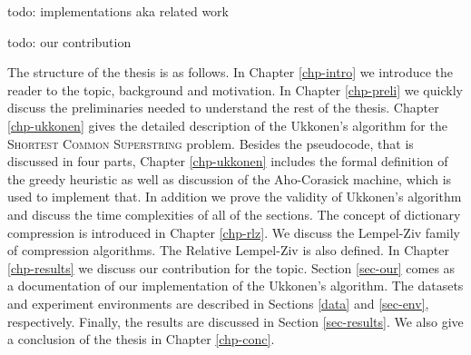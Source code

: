 \documentclass[english,twoside,censored,csm,algorithms-track-2020]{HYthesisML}
\theoremstyle{plain}
\theoremstyle{definition}
\begin{document}
todo: implementations aka related work

todo: our contribution

The structure of the thesis is as follows. In Chapter \ref{chp-intro} we introduce the reader to the
topic, background and motivation. In Chapter \ref{chp-preli} we quickly discuss the
preliminaries needed to understand the rest of the thesis. Chapter \ref{chp-ukkonen} gives the detailed
description of the Ukkonen's algorithm for the \textsc{Shortest Common Superstring} problem.
Besides the pseudocode, that is discussed in four parts, Chapter \ref{chp-ukkonen} includes the
formal definition of the greedy heuristic as well as discussion of the Aho-Corasick machine,
which is used to implement that. In addition we prove the validity of Ukkonen's algorithm
and discuss the time complexities of all of the sections. The concept of dictionary compression is
introduced in Chapter \ref{chp-rlz}. We discuss the Lempel-Ziv family of compression algorithms. The
Relative Lempel-Ziv is also defined. In Chapter \ref{chp-results} we discuss our contribution for
the topic. Section \ref{sec-our} comes as a documentation of our implementation of the Ukkonen's
algorithm. The datasets and experiment environments are described in Sections \ref{data} and
\ref{sec-env}, respectively. Finally, the results are discussed in Section \ref{sec-results}.
We also give a conclusion of the thesis in Chapter \ref{chp-conc}.

\newpage





  

  
\end{document}
